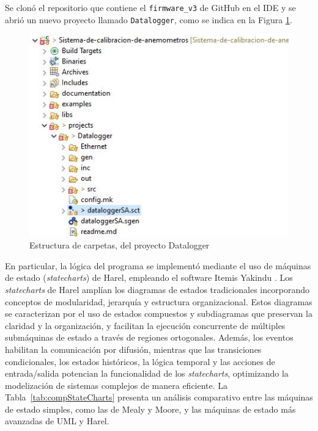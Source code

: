 Se clonó el repositorio que contiene el \texttt{firmware\_v3} de GitHub en el IDE y se abrió un nuevo proyecto llamado \texttt{Datalogger}, como se indica en la Figura \ref{fig:projectDataloggerFolder}.

\begin{figure}[H]
    \centering
    \includegraphics[width=0.40\linewidth]{Figuras/datalogger/Firmware/projectDataloggerFolder.jpg}
    \caption{Estructura de carpetas, del proyecto Datalogger}
    \label{fig:projectDataloggerFolder}
\end{figure}
En particular, la lógica del programa se implementó mediante el uso de máquinas de estado (\textit{statecharts}) de Harel, empleando el software Itemis Yakindu \cite{itemis_create}. Los \textit{statecharts} de Harel amplían los diagramas de estados tradicionales incorporando conceptos de modularidad, jerarquía y estructura organizacional. Estos diagramas se caracterizan por el uso de estados compuestos y subdiagramas que preservan la claridad y la organización, y facilitan la ejecución concurrente de múltiples submáquinas de estado a través de regiones ortogonales. Además, los eventos habilitan la comunicación por difusión, mientras que las transiciones condicionales, los estados históricos, la lógica temporal y las acciones de entrada/salida potencian la funcionalidad de los \textit{statecharts}, optimizando la modelización de sistemas complejos de manera eficiente. La Tabla~\ref{tab:compStateCharts} presenta un análisis comparativo entre las máquinas de estado simples, como las de Mealy y Moore, y las máquinas de estado más avanzadas de UML y Harel.


